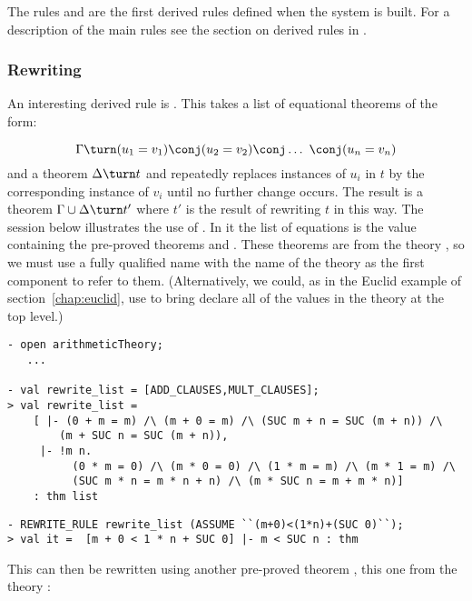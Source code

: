 The rules  and  are the first derived rules
defined when the \HOL{} system is built. For a description of the main
rules see the section on derived rules in \DESCRIPTION.

\subsubsection{Rewriting}

An interesting derived rule is .  This takes a list of
equational theorems of the form:

\[
\Gamma\turn (u_1 = v_1) \conj (u_2 = v_2) \conj \ldots\ \conj (u_n  = v_n)
\]
and a theorem $\Delta\turn t$ and repeatedly replaces instances of $u_i$ in $t$ by the corresponding instance of $v_i$ until no further change occurs.
The result is a theorem $\Gamma\cup\Delta\turn t'$ where $t'$ is the result of rewriting $t$ in this way.
The session below illustrates the use of .
In it the list of equations is the value  containing the pre-proved theorems  and .
These theorems are from the theory , so we must use a fully qualified name with the name of the theory as the first component to refer to them.
(Alternatively, we could, as in the Euclid example of section~\ref{chap:euclid}, use  to bring declare all of the values in the theory at the top level.)

\begin{session}
\begin{verbatim}
- open arithmeticTheory;
   ...

- val rewrite_list = [ADD_CLAUSES,MULT_CLAUSES];
> val rewrite_list =
    [ |- (0 + m = m) /\ (m + 0 = m) /\ (SUC m + n = SUC (m + n)) /\
        (m + SUC n = SUC (m + n)),
     |- !m n.
          (0 * m = 0) /\ (m * 0 = 0) /\ (1 * m = m) /\ (m * 1 = m) /\
          (SUC m * n = m * n + n) /\ (m * SUC n = m + m * n)]
    : thm list
\end{verbatim}
\end{session}

\begin{session}
\begin{verbatim}
- REWRITE_RULE rewrite_list (ASSUME ``(m+0)<(1*n)+(SUC 0)``);
> val it =  [m + 0 < 1 * n + SUC 0] |- m < SUC n : thm
\end{verbatim}
\end{session}

\noindent
This can then be rewritten using another pre-proved theorem
, this one from the theory :


